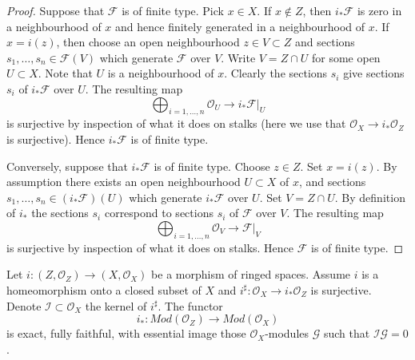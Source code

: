 \begin{proof}
Suppose that $\mathcal{F}$ is of finite type.
Pick $x \in X$. If $x \not \in Z$, then $i_*\mathcal{F}$
is zero in a neighbourhood of $x$ and hence finitely generated in
a neighbourhood of $x$. If $x = i(z)$, then choose an open neighbourhood
$z \in V \subset Z$ and sections $s_1, \ldots, s_n \in \mathcal{F}(V)$
which generate $\mathcal{F}$ over $V$. Write $V = Z \cap U$ for some open
$U \subset X$. Note that $U$ is a neighbourhood of $x$. Clearly the
sections $s_i$ give sections $s_i$ of $i_*\mathcal{F}$ over $U$.
The resulting map
$$
\bigoplus\nolimits_{i = 1, \ldots, n} \mathcal{O}_U
\longrightarrow
i_*\mathcal{F}|_U
$$
is surjective by inspection of what it does on stalks
(here we use that $\mathcal{O}_X \to i_*\mathcal{O}_Z$
is surjective). Hence $i_*\mathcal{F}$
is of finite type.

\medskip\noindent
Conversely, suppose that $i_*\mathcal{F}$ is of finite type.
Choose $z \in Z$. Set $x = i(z)$. By assumption there exists
an open neighbourhood $U \subset X$ of $x$, and sections
$s_1, \ldots, s_n \in (i_*\mathcal{F})(U)$ which generate $i_*\mathcal{F}$
over $U$. Set $V = Z \cap U$. By definition of $i_*$ the sections
$s_i$ correspond to sections $s_i$ of $\mathcal{F}$ over $V$.
The resulting map
$$
\bigoplus\nolimits_{i = 1, \ldots, n} \mathcal{O}_V
\longrightarrow
\mathcal{F}|_V
$$
is surjective by inspection of what it does on stalks. Hence
$\mathcal{F}$ is of finite type.
\end{proof}

\begin{lemma}
\label{lemma-i-star-equivalence}
Let $i : (Z, \mathcal{O}_Z) \to (X, \mathcal{O}_X)$ be a morphism
of ringed spaces. Assume $i$ is a homeomorphism onto a closed subset of $X$
and $i^\sharp : \mathcal{O}_X \to i_*\mathcal{O}_Z$ is surjective.
Denote $\mathcal{I} \subset \mathcal{O}_X$ the kernel of $i^\sharp$.
The functor
$$
i_* :
\textit{Mod}(\mathcal{O}_Z)
\longrightarrow
\textit{Mod}(\mathcal{O}_X)
$$
is exact, fully faithful, with essential image those
$\mathcal{O}_X$-modules $\mathcal{G}$ such that $\mathcal{I}\mathcal{G} = 0$.
\end{lemma}

